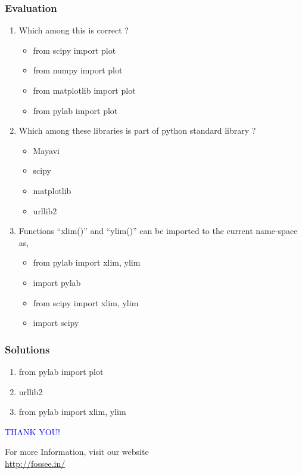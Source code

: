 \documentclass[presentation]{beamer}
\begin{document}
\begin{frame}
\frametitle{Evaluation}
\label{sec-16}


\begin{enumerate}
\item Which among this is correct ?
\begin{itemize}
\item from scipy import plot
\item from numpy import plot
\item from matplotlib import plot
\item from pylab import plot
\end{itemize}
\vspace{2pt}
\item Which among these libraries is part of python standard library ?
\begin{itemize}
\item Mayavi
\item scipy
\item matplotlib
\item urllib2
\end{itemize}
\vspace{2pt}
\item Functions ``xlim()'' and ``ylim()'' can be imported to the current
   name-space as,
\begin{itemize}
\item from pylab import xlim, ylim
\item import pylab
\item from scipy import xlim, ylim
\item import scipy
\end{itemize}
\end{enumerate}
\end{frame}
\begin{frame}
\frametitle{Solutions}
\label{sec-17}


\begin{enumerate}
\item from pylab import plot
\vspace{12pt}
\item urllib2
\vspace{12pt}
\item from pylab import xlim, ylim
\end{enumerate}
\end{frame}
\begin{frame}

 \begin{block}{}
  \begin{center}
  \textcolor{blue}{\Large THANK YOU!} 
  \end{center}
  \end{block}
\begin{block}{}
  \begin{center}
    For more Information, visit our website\\
    \url{http://fossee.in/}
  \end{center}  
  \end{block}
\end{frame}
\end{document}
